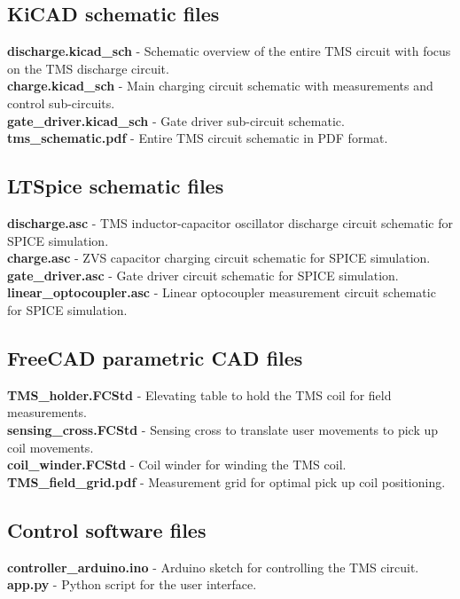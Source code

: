 \documentclass[11pt, letterpaper]{article}
\begin{document}
\vskip 0.3cm
\noindent
\subsection*{KiCAD schematic files}
\textbf{discharge.kicad\_sch} - Schematic overview of the entire TMS circuit with focus on the TMS discharge circuit. \\
\textbf{charge.kicad\_sch} - Main charging circuit schematic with measurements and control sub-circuits. \\
\textbf{gate\_driver.kicad\_sch} - Gate driver sub-circuit schematic. \\
\textbf{tms\_schematic.pdf} - Entire TMS circuit schematic in PDF format. \\

\subsection*{LTSpice schematic files}
\textbf{discharge.asc} - TMS inductor-capacitor oscillator discharge circuit schematic for SPICE simulation. \\
\textbf{charge.asc} - ZVS capacitor charging circuit schematic for SPICE simulation. \\
\textbf{gate\_driver.asc} - Gate driver circuit schematic for SPICE simulation. \\
\textbf{linear\_optocoupler.asc} - Linear optocoupler measurement circuit schematic for SPICE simulation. \\

\subsection*{FreeCAD parametric CAD files}
\textbf{TMS\_holder.FCStd} - Elevating table to hold the TMS coil for field measurements. \\
\textbf{sensing\_cross.FCStd} - Sensing cross to translate user movements to pick up coil movements. \\
\textbf{coil\_winder.FCStd} - Coil winder for winding the TMS coil. \\
\textbf{TMS\_field\_grid.pdf} - Measurement grid for optimal pick up coil positioning. \\

\subsection*{Control software files}
\textbf{controller\_arduino.ino} - Arduino sketch for controlling the TMS circuit. \\
\textbf{app.py} - Python script for the user interface. \\
\end{document}
